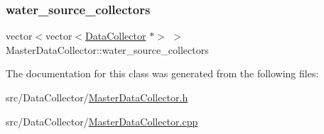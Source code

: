 \mbox{\label{classMasterDataCollector_a31899d6d3b2f7106cbacf7c3dd0e46c0_a31899d6d3b2f7106cbacf7c3dd0e46c0}} 
\subsubsection{\texorpdfstring{water\+\_\+source\+\_\+collectors}{water\_source\_collectors}}
{\footnotesize\ttfamily vector$<$vector$<$\mbox{\hyperlink{classDataCollector}{Data\+Collector}} $\ast$$>$ $>$ Master\+Data\+Collector\+::water\+\_\+source\+\_\+collectors\hspace{0.3cm}{\ttfamily [private]}}



The documentation for this class was generated from the following files\+:\begin{DoxyCompactItemize}
\item 
src/\+Data\+Collector/\mbox{\hyperlink{MasterDataCollector_8h}{Master\+Data\+Collector.\+h}}\item 
src/\+Data\+Collector/\mbox{\hyperlink{MasterDataCollector_8cpp}{Master\+Data\+Collector.\+cpp}}\end{DoxyCompactItemize}
